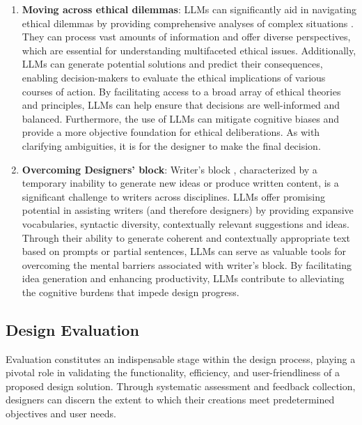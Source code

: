 \documentclass{article}
\begin{document}
\begin{enumerate}
    \item \textbf{Moving across ethical dilemmas}: LLMs can significantly aid in navigating ethical dilemmas by providing comprehensive analyses of complex situations \cite{shaer2024ai}. They can process vast amounts of information and offer diverse perspectives, which are essential for understanding multifaceted ethical issues. Additionally, LLMs can generate potential solutions and predict their consequences, enabling decision-makers to evaluate the ethical implications of various courses of action. By facilitating access to a broad array of ethical theories and principles, LLMs can help ensure that decisions are well-informed and balanced. Furthermore, the use of LLMs can mitigate cognitive biases and provide a more objective foundation for ethical deliberations. As with clarifying ambiguities, it is for the designer to make the final decision.  
    \item \textbf{Overcoming Designers' block}: Writer's block \cite{rose2009writer}, characterized by a temporary inability to generate new ideas or produce written content, is a significant challenge to writers across disciplines. LLMs offer promising potential in assisting writers (and therefore designers) by providing expansive vocabularies, syntactic diversity, contextually relevant suggestions and ideas. Through their ability to generate coherent and contextually appropriate text based on prompts or partial sentences, LLMs can serve as valuable tools for overcoming the mental barriers associated with writer's block. By facilitating idea generation and enhancing productivity, LLMs contribute to alleviating the cognitive burdens that impede design progress. 
\end{enumerate}



\subsection{Design Evaluation}

Evaluation constitutes an indispensable stage within the design process, playing a pivotal role in validating the functionality, efficiency, and user-friendliness of a proposed design solution. Through systematic assessment and feedback collection, designers can discern the extent to which their creations meet predetermined objectives and user needs. 
\end{document}
